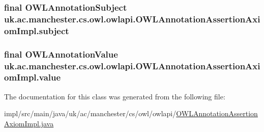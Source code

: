 \hypertarget{classuk_1_1ac_1_1manchester_1_1cs_1_1owl_1_1owlapi_1_1_o_w_l_annotation_assertion_axiom_impl_a62580c2c3611f98a32b3a0cbf7c748a2}{
\subsubsection[{subject}]{\setlength{\rightskip}{0pt plus 5cm}final {\bf O\-W\-L\-Annotation\-Subject} uk.\-ac.\-manchester.\-cs.\-owl.\-owlapi.\-O\-W\-L\-Annotation\-Assertion\-Axiom\-Impl.\-subject\hspace{0.3cm}{\ttfamily [private]}}}\label{classuk_1_1ac_1_1manchester_1_1cs_1_1owl_1_1owlapi_1_1_o_w_l_annotation_assertion_axiom_impl_a62580c2c3611f98a32b3a0cbf7c748a2}
\hypertarget{classuk_1_1ac_1_1manchester_1_1cs_1_1owl_1_1owlapi_1_1_o_w_l_annotation_assertion_axiom_impl_aca80ff59c41f5729c748171c7ef969f9}{
\subsubsection[{value}]{\setlength{\rightskip}{0pt plus 5cm}final {\bf O\-W\-L\-Annotation\-Value} uk.\-ac.\-manchester.\-cs.\-owl.\-owlapi.\-O\-W\-L\-Annotation\-Assertion\-Axiom\-Impl.\-value\hspace{0.3cm}{\ttfamily [private]}}}\label{classuk_1_1ac_1_1manchester_1_1cs_1_1owl_1_1owlapi_1_1_o_w_l_annotation_assertion_axiom_impl_aca80ff59c41f5729c748171c7ef969f9}


The documentation for this class was generated from the following file\-:\begin{DoxyCompactItemize}
\item 
impl/src/main/java/uk/ac/manchester/cs/owl/owlapi/\hyperlink{_o_w_l_annotation_assertion_axiom_impl_8java}{O\-W\-L\-Annotation\-Assertion\-Axiom\-Impl.\-java}\end{DoxyCompactItemize}
